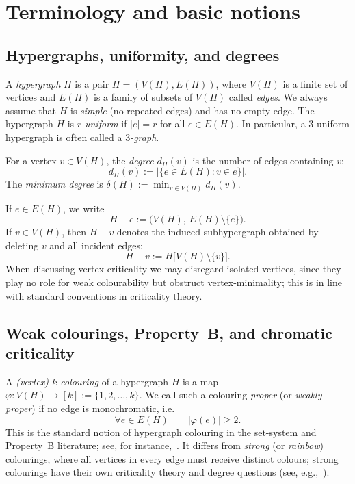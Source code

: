 \documentclass[11pt]{amsart}
\theoremstyle{definition}
\theoremstyle{remark}
\newcommand{\V}{V}
\newcommand{\E}{E}
\newcommand{\del}{\delta}
\begin{document}
\section{Terminology and basic notions}\label{sec:terminology}

\subsection{Hypergraphs, uniformity, and degrees}

A \emph{hypergraph} $H$ is a pair $H=(\V(H),\E(H))$, where $\V(H)$ is a finite set of vertices and $\E(H)$ is a family of subsets of $\V(H)$ called \emph{edges}.
We always assume that $H$ is \emph{simple} (no repeated edges) and has no empty edge.
The hypergraph $H$ is \emph{$r$-uniform} if $|e|=r$ for all $e\in \E(H)$.
In particular, a $3$-uniform hypergraph is often called a \emph{$3$-graph}.

For a vertex $v\in \V(H)$, the \emph{degree} $d_H(v)$ is the number of edges containing $v$:
\[
d_H(v):=\bigl|\{e\in \E(H): v\in e\}\bigr|.
\]
The \emph{minimum degree} is $\del(H):=\min_{v\in \V(H)} d_H(v)$.

If $e\in \E(H)$, we write
\[
H-e := \bigl(\V(H),\,\E(H)\setminus\{e\}\bigr).
\]
If $v\in \V(H)$, then $H-v$ denotes the induced subhypergraph obtained by deleting $v$ and all incident edges:
\[
H-v := H\bigl[\V(H)\setminus\{v\}\bigr].
\]
When discussing vertex-criticality we may disregard isolated vertices, since they play no role for weak colourability but obstruct vertex-minimality; this is in line with standard conventions in criticality theory.\cite{KostochkaWoodall2000}

\subsection{Weak colourings, Property~B, and chromatic criticality}

A \emph{(vertex) $k$-colouring} of a hypergraph $H$ is a map $\varphi:\V(H)\to[k]:=\{1,2,\dots,k\}$.
We call such a colouring \emph{proper} (or \emph{weakly proper}) if no edge is monochromatic, i.e.
\[
\forall e\in \E(H)\qquad \bigl|\varphi(e)\bigr|\ge 2.
\]
This is the standard notion of hypergraph colouring in the set-system and Property~B literature; see, for instance,~\cite{Berge1989,BujtasTuzaVoloshin2015,DurajGutowskiKozik2018}.
It differs from \emph{strong} (or \emph{rainbow}) colourings, where all vertices in every edge must receive distinct colours; strong colourings have their own criticality theory and degree questions (see, e.g.,~\cite{KostochkaWoodall2000}).
\end{document}
